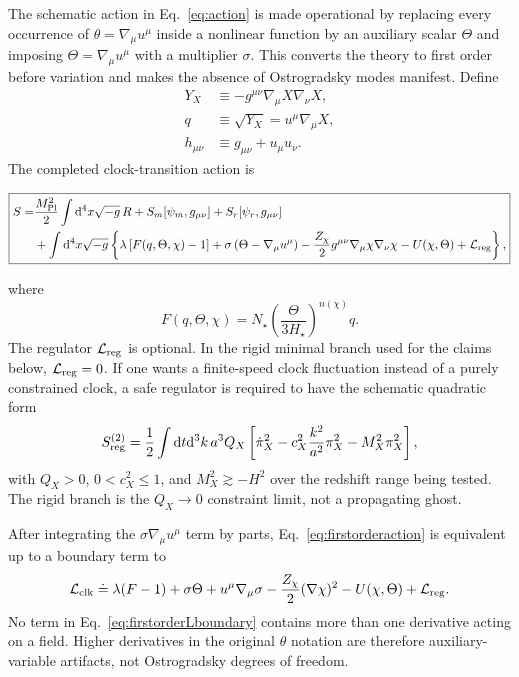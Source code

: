 \documentclass[aps,prd,reprint,nofootinbib,superscriptaddress,longbibliography]{revtex4-2}
\newcommand{\dd}{\mathrm{d}}
\newcommand{\mpl}{M_{\rm Pl}}
\begin{document}
The schematic action in Eq.~\eqref{eq:action} is made operational by replacing every occurrence of $\theta=\nabla_\mu u^\mu$ inside a nonlinear function by an auxiliary scalar $\Theta$ and imposing $\Theta=\nabla_\mu u^\mu$ with a multiplier $\sigma$.  This converts the theory to first order before variation and makes the absence of Ostrogradsky modes manifest.  Define
\begin{align}
  Y_X&\equiv -g^{\mu\nu}\nabla_\mu X\nabla_\nu X,\nonumber\\
  q&\equiv \sqrt{Y_X}=u^\mu\nabla_\mu X,\label{eq:Yqdefs}\\
  h_{\mu\nu}&\equiv g_{\mu\nu}+u_\mu u_\nu .\nonumber
\end{align}
The completed clock-transition action is
\begin{widetext}
\begin{equation}
\boxed{
\begin{split}
S=&\frac{\mpl^2}{2}\int \dd^4x\sqrt{-g}\,R
   +S_m[\psi_m,g_{\mu\nu}]
   +S_r[\psi_r,g_{\mu\nu}] \\
&+\int \dd^4x\sqrt{-g}\left\{
  \lambda\left[F(q,\Theta,\chi)-1\right]
  +\sigma\left(\Theta-\nabla_\mu u^\mu\right)
  -\frac{Z_\chi}{2}g^{\mu\nu}\nabla_\mu\chi\nabla_\nu\chi
  -U(\chi,\Theta)
  +{\cal L}_{\rm reg}\right\},
\end{split}}
\label{eq:firstorderaction}
\end{equation}
\end{widetext}
where
\begin{equation}
  F(q,\Theta,\chi)
  =N_\star\left(\frac{\Theta}{3H_\star}\right)^{n(\chi)}q .
  \label{eq:Fdef}
\end{equation}
The regulator $\mathcal L_{\rm reg}$ is optional.  In the rigid minimal branch used for the claims below, $\mathcal L_{\rm reg}=0$.  If one wants a finite-speed clock fluctuation instead of a purely constrained clock, a safe regulator is required to have the schematic quadratic form
\begin{equation}
  S_{\rm reg}^{(2)}=\frac12\int\dd t\dd^3k\,a^3 Q_X
  \left[\dot\pi_X^2-c_X^2\frac{k^2}{a^2}\pi_X^2-M_X^2\pi_X^2\right],
  \label{eq:regulatorquad}
\end{equation}
with $Q_X>0$, $0<c_X^2\leq 1$, and $M_X^2\gtrsim -H^2$ over the redshift range being tested.  The rigid branch is the $Q_X\to0$ constraint limit, not a propagating ghost.

After integrating the $\sigma\nabla_\mu u^\mu$ term by parts, Eq.~\eqref{eq:firstorderaction} is equivalent up to a boundary term to
\begin{equation}
  {\cal L}_{\rm clk}\doteq
  \lambda(F-1)+\sigma\Theta+u^\mu\nabla_\mu\sigma
  -\frac{Z_\chi}{2}(\nabla\chi)^2-U(\chi,\Theta)+{\cal L}_{\rm reg} .
  \label{eq:firstorderLboundary}
\end{equation}
No term in Eq.~\eqref{eq:firstorderLboundary} contains more than one derivative acting on a field.  Higher derivatives in the original $\theta$ notation are therefore auxiliary-variable artifacts, not Ostrogradsky degrees of freedom.
\end{document}
